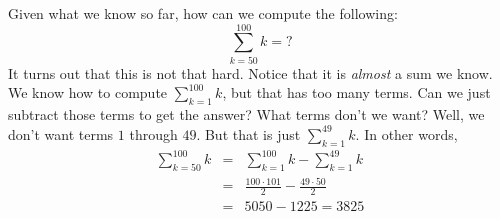 \begin{exa}
Given what we know so far, how can we compute the following:
$$ \sum_{k=50}^{100} k=?$$
It turns out that this is not that hard.  Notice that it is {\em almost} a sum we know.
We know how to compute ${\displaystyle \sum_{k=1}^{100} k}$, but that has too many terms.
Can we just subtract those terms to get the answer?  What terms don't we want?
Well, we don't want terms $1$ through $49$.  But that is just  ${\displaystyle \sum_{k=1}^{49} k}$.
In other words, 
\begin{eqnarray*}
\sum_{k=50}^{100} k&=&\sum_{k=1}^{100} k - \sum_{k=1}^{49} k\\
&=&\frac{100\cdot 101}{2} - \frac{49\cdot 50}{2}\\
&=&5050-1225=3825
\end{eqnarray*}
\end{exa}


